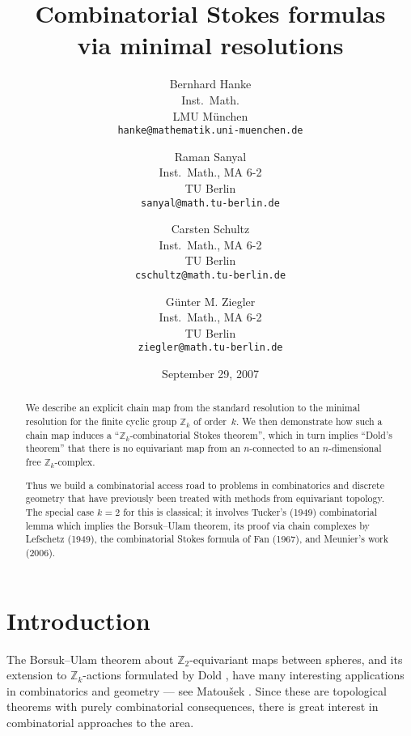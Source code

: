 \documentclass[11pt,a4paper,draft]{article}
\newcommand{\Z}{{\mathbb Z}}
\theoremstyle{definition}
\begin{document}
\title{Combinatorial Stokes formulas\\
       via minimal resolutions}
\author{Bernhard Hanke\\Inst.\ Math.\\LMU M\"unchen\\
         \texttt{hanke@mathematik.uni-muenchen.de}
 \and    Raman Sanyal\\Inst.\ Math., MA 6-2\\TU Berlin\\
         \texttt{sanyal@math.tu-berlin.de}
 \and    Carsten Schultz\\Inst.\ Math., MA 6-2\\TU Berlin\\
         \texttt{cschultz@math.tu-berlin.de}
 \and    G\"unter M. Ziegler\\Inst.\ Math., MA 6-2\\TU Berlin\\
         \texttt{ziegler@math.tu-berlin.de}
}
\date{September 29, 2007}
\maketitle

\begin{abstract}
  We describe an explicit chain map from the standard resolution to the
  minimal resolution for the finite cyclic group $\Z_k$ of order~$k$.  We
  then demonstrate how such a chain map induces a ``$\Z_k$-combinatorial
  Stokes theorem'', which in turn implies ``Dold's theorem'' that there is
  no equivariant map from an $n$-connected to an $n$-dimensional free
  $\Z_k$-complex.

  Thus we build a combinatorial access road to problems in combinatorics and
  discrete geometry that have previously been treated with methods from
  equivariant topology.
  The special case $k=2$ for this is classical; it involves
  Tucker's (1949) combinatorial lemma which implies the Borsuk--Ulam
  theorem, its proof via chain complexes by Lefschetz (1949),
  the combinatorial Stokes formula of Fan (1967), and
  Meunier's work (2006).
\end{abstract}

\section{Introduction}

The Borsuk--Ulam theorem \cite{Borsuk} about $\Z_2$-equivariant maps
between spheres,
and its extension to $\Z_k$-actions formulated by Dold \cite{Dold},
have many interesting applications in combinatorics and geometry ---
see Matou\v{s}ek \cite{Matousek:BU}.
Since these are topological theorems with purely combinatorial
consequences, there is great interest in combinatorial approaches
to the area.
\end{document}
